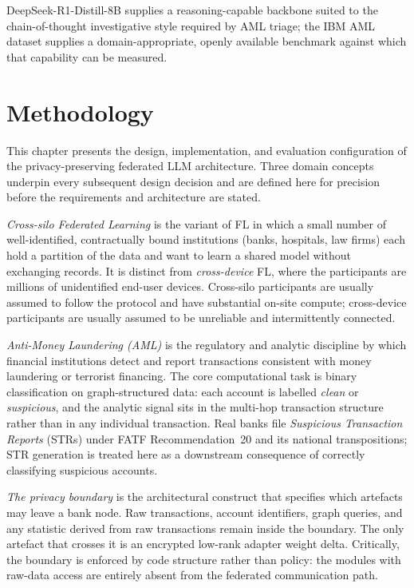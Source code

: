\documentclass{report}
\begin{document}
DeepSeek-R1-Distill-8B supplies a reasoning-capable backbone suited to the chain-of-thought investigative style required by AML triage; the IBM AML dataset supplies a domain-appropriate, openly available benchmark against which that capability can be measured.


\chapter{Methodology}
\label{ch:method}

This chapter presents the design, implementation, and evaluation configuration of the privacy-preserving federated LLM architecture. Three domain concepts underpin every subsequent design decision and are defined here for precision before the requirements and architecture are stated.

\textit{Cross-silo Federated Learning} is the variant of FL in which a small number of well-identified, contractually bound institutions (banks, hospitals, law firms) each hold a partition of the data and want to learn a shared model without exchanging records. It is distinct from \textit{cross-device} FL, where the participants are millions of unidentified end-user devices. Cross-silo participants are usually assumed to follow the protocol and have substantial on-site compute; cross-device participants are usually assumed to be unreliable and intermittently connected.

\textit{Anti-Money Laundering (AML)} is the regulatory and analytic discipline by which financial institutions detect and report transactions consistent with money laundering or terrorist financing. The core computational task is binary classification on graph-structured data: each account is labelled \textit{clean} or \textit{suspicious}, and the analytic signal sits in the multi-hop transaction structure rather than in any individual transaction. Real banks file \textit{Suspicious Transaction Reports} (STRs) under FATF Recommendation~20 and its national transpositions; STR generation is treated here as a downstream consequence of correctly classifying suspicious accounts.

\textit{The privacy boundary} is the architectural construct that specifies which artefacts may leave a bank node. Raw transactions, account identifiers, graph queries, and any statistic derived from raw transactions remain inside the boundary. The only artefact that crosses it is an encrypted low-rank adapter weight delta. Critically, the boundary is enforced by code structure rather than policy: the modules with raw-data access are entirely absent from the federated communication path.
\end{document}
